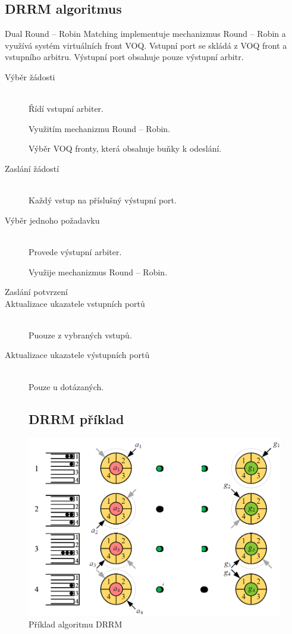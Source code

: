 \subsection{DRRM algoritmus}
Dual Round -- Robin Matching implementuje mechanizmus Round -- Robin a využívá systém virtuálních front VOQ. Vstupní port se skládá z VOQ front a vstupního arbitru. Výstupní port obsahuje pouze výstupní arbitr.
\begin{description}
  \item [Výběr žádosti] \hfill \\
  Řídí vstupní arbiter. \par
  Využitím mechanizmu Round -- Robin. \par
  Výběr VOQ fronty, která obsahuje buňky k odeslání. \par
  \item [Zaslání žádostí] \hfill \\
  Každý vstup na příslušný výstupní port. \par
  \item [Výběr jednoho požadavku] \hfill \\
  Provede výstupní arbiter. \par
  Využije mechanizmus Round -- Robin. \par
  \item[Zaslání potvrzení] \hfill
  \item [Aktualizace ukazatele vstupních portů] \hfill \\
  Puouze z vybraných vstupů. \par
  \item [Aktualizace ukazatele výstupních portů] \hfill \\
  Pouze u dotázaných. \par
  \subsection{DRRM příklad}
\end{description}
\begin{figure}[ht]
\centering
  \begin{center}
    \includegraphics[scale=0.5]{images/DRRM_priklad.png}
  \end{center}
  \caption[Příklad algoritmu DRRM]{Příklad algoritmu DRRM}
\end{figure}
